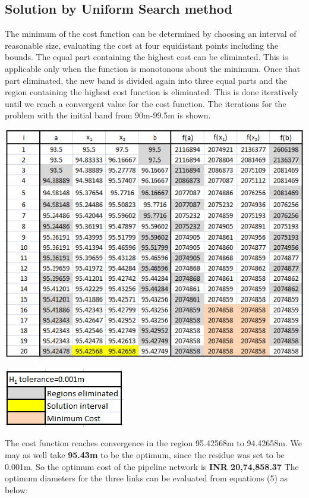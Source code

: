 \documentclass[10pt,a4paper]{article}
\begin{document}
 \subsection{Solution by Uniform Search method}
\par The minimum of the cost function can be determined by choosing an interval of reasonable size, evaluating the cost at four equidistant points including the bounds. The equal part containing the highest cost can be eliminated. This is applicable only when the function is monotonous about the minimum. Once that part eliminated, the new band is divided again into three equal parts and the region containing the highest cost function is eliminated. This is done iteratively until we reach a convergent value for the cost function. The iterations for the problem with the initial band from 90m-99.5m is shown.
 \begin{center}
 \includegraphics[scale=0.75]{m1}
\end{center}
\begin{center}
  \includegraphics[scale=0.8]{m2}
\end{center}
 
 The cost function reaches convergence in the region 95.42568m to 94.42658m. We may as well take \textbf{95.43m} to be the optimum, since the residue was set to be 0.001m. So the optimum cost of the pipeline network is \textbf{INR 20,74,858.37}
 \newline The optimum diameters for the three links can be evaluated from equations (5) as below:
 
\end{document}
